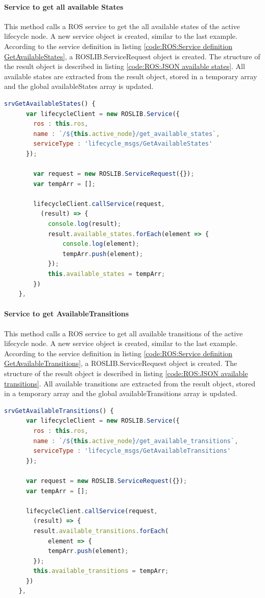 \paragraph{Service to get all available States} This method calls a ROS service to get the all available states of the active lifecycle node. A new service object is created, similar to the last example. According to the service definition in listing \ref{code:ROS:Service definition GetAvailableStates}, a ROSLIB.ServiceRequest object is created. The structure of the result object is described in listing \ref{code:ROS:JSON available states}. All available states are extracted from the result object, stored in a temporary array and the global availableStates array is updated.
\begin{lstlisting}[language=JavaScript,
	caption={Method to get available States}, 
	label={code:Vue}]
	srvGetAvailableStates() {
	  var lifecycleClient = new ROSLIB.Service({
		ros : this.ros,
		name : `/${this.active_node}/get_available_states`,
		serviceType : 'lifecycle_msgs/GetAvailableStates'
	  });

		var request = new ROSLIB.ServiceRequest({});
		var tempArr = [];

		lifecycleClient.callService(request, 
		  (result) => {
			console.log(result);
			result.available_states.forEach(element => {
				console.log(element);
				tempArr.push(element);
			});
			this.available_states = tempArr;
		})
	},

\end{lstlisting}

\paragraph{Service to get AvailableTransitions} This method calls a ROS service to get all available transitions of the active lifecycle node. A new service object is created, similar to the last example. According to the service definition in listing \ref{code:ROS:Service definition GetAvailableTransitions}, a ROSLIB.ServiceRequest object is created. The structure of the result object is described in listing \ref{code:ROS:JSON available transitions}. All available transitions are extracted from the result object, stored in a temporary array and the global availableTransitions array is updated.
\begin{lstlisting}[language=JavaScript,
	caption={Method to get available Transitions}, 
	label={code:Vue}]
	srvGetAvailableTransitions() {
	  var lifecycleClient = new ROSLIB.Service({
		ros : this.ros,
		name : `/${this.active_node}/get_available_transitions`,
		serviceType : 'lifecycle_msgs/GetAvailableTransitions'
	  });

	  var request = new ROSLIB.ServiceRequest({});
	  var tempArr = [];
	
	  lifecycleClient.callService(request, 
		(result) => {
		result.available_transitions.forEach(
			element => {
			tempArr.push(element);
		});
		this.available_transitions = tempArr;
	  })
	},
\end{lstlisting}


